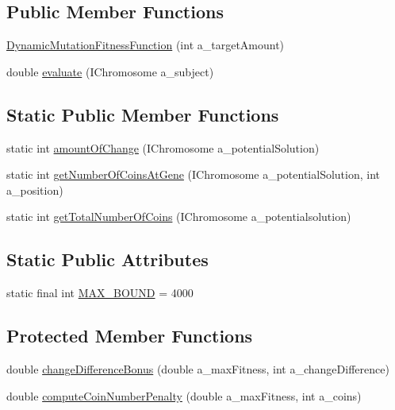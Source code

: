 \subsection*{Public Member Functions}
\begin{DoxyCompactItemize}
\item 
\hyperlink{classexamples_1_1dynamic_mutation_1_1_dynamic_mutation_fitness_function_a09d7a07316b309c3ad0572c23b8fb6ed}{Dynamic\-Mutation\-Fitness\-Function} (int a\-\_\-target\-Amount)
\item 
double \hyperlink{classexamples_1_1dynamic_mutation_1_1_dynamic_mutation_fitness_function_a57e8a49d67717a2be1b0a33bd2376d6c}{evaluate} (I\-Chromosome a\-\_\-subject)
\end{DoxyCompactItemize}
\subsection*{Static Public Member Functions}
\begin{DoxyCompactItemize}
\item 
static int \hyperlink{classexamples_1_1dynamic_mutation_1_1_dynamic_mutation_fitness_function_a528146448f6bb801e422c493e189e6aa}{amount\-Of\-Change} (I\-Chromosome a\-\_\-potential\-Solution)
\item 
static int \hyperlink{classexamples_1_1dynamic_mutation_1_1_dynamic_mutation_fitness_function_ad580e29bc08c24dcb8cd1f93bba75192}{get\-Number\-Of\-Coins\-At\-Gene} (I\-Chromosome a\-\_\-potential\-Solution, int a\-\_\-position)
\item 
static int \hyperlink{classexamples_1_1dynamic_mutation_1_1_dynamic_mutation_fitness_function_a7f9f9883b5852d180835d2bab53f3f65}{get\-Total\-Number\-Of\-Coins} (I\-Chromosome a\-\_\-potentialsolution)
\end{DoxyCompactItemize}
\subsection*{Static Public Attributes}
\begin{DoxyCompactItemize}
\item 
static final int \hyperlink{classexamples_1_1dynamic_mutation_1_1_dynamic_mutation_fitness_function_a72501ebb1ccd6fcd85c2b480c6c41907}{M\-A\-X\-\_\-\-B\-O\-U\-N\-D} = 4000
\end{DoxyCompactItemize}
\subsection*{Protected Member Functions}
\begin{DoxyCompactItemize}
\item 
double \hyperlink{classexamples_1_1dynamic_mutation_1_1_dynamic_mutation_fitness_function_a17ad15c1c38b1c902098d9e13be667c9}{change\-Difference\-Bonus} (double a\-\_\-max\-Fitness, int a\-\_\-change\-Difference)
\item 
double \hyperlink{classexamples_1_1dynamic_mutation_1_1_dynamic_mutation_fitness_function_ae8d660839994fa367d3786015459e863}{compute\-Coin\-Number\-Penalty} (double a\-\_\-max\-Fitness, int a\-\_\-coins)
\end{DoxyCompactItemize}
